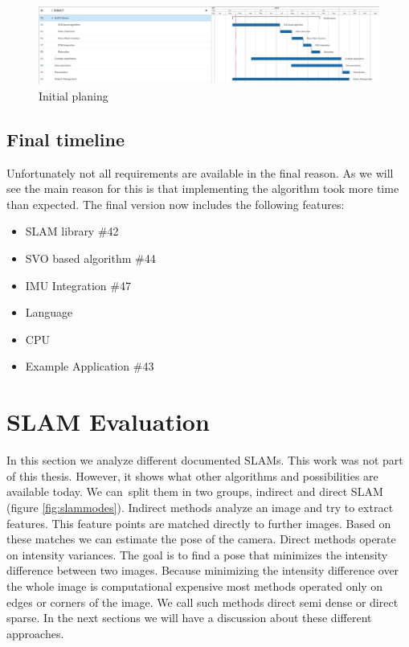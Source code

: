 \documentclass[11pt,a4paper,titlepage,oneside]{report}
\begin{document}
\begin{figure}[H]
  \includegraphics[width=1.0\textwidth]{img/gantt.png}
  \caption{Initial planing}\label{fig:gantt}
\end{figure}

\section{Final timeline}

Unfortunately not all requirements are available in the final reason. As we will see the main reason for this is that implementing the algorithm took more time than expected. The final version now includes the following features:
\begin{itemize}
  \item{SLAM library \#42}
  \item{SVO based algorithm \#44}
  \item{IMU Integration \#47}
  \item{Language}
  \item{CPU}
  \item{Example Application \#43}
\end{itemize}

\chapter{SLAM Evaluation}\label{chap:evaluation}

In this section we analyze different documented SLAMs. This work was not part of this thesis. However, it shows what other algorithms and possibilities are available today. We can split them in two groups, indirect and direct SLAM (figure \ref{fig:slammodes}). Indirect methods analyze an image and try to extract features. This feature points are matched directly to further images. Based on these matches we can estimate the pose of the camera. Direct methods operate on intensity variances. The goal is to find a pose that minimizes the intensity difference between two images. Because minimizing the intensity difference over the whole image is computational expensive most methods operated only on edges or corners of the image. We call such methods direct semi dense or direct sparse. In the next sections we will have a discussion about these different approaches.
\end{document}
